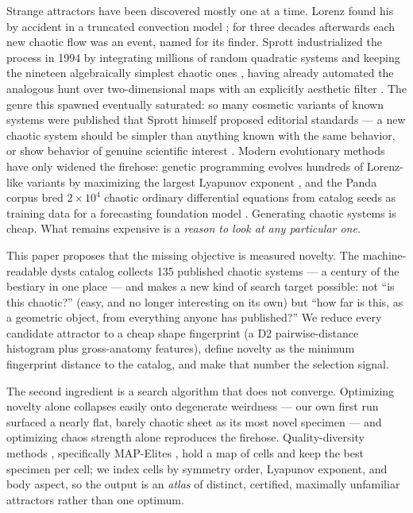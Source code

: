 \documentclass[11pt]{article}
\begin{document}
Strange attractors have been discovered mostly one at a time. Lorenz found
his by accident in a truncated convection model \citep{lorenz1963}; for
three decades afterwards each new chaotic flow was an event, named for its
finder. Sprott industrialized the process in 1994 by integrating millions
of random quadratic systems and keeping the nineteen algebraically simplest
chaotic ones \citep{sprott1994}, having already automated the analogous
hunt over two-dimensional maps with an explicitly aesthetic filter
\citep{sprott1993}. The genre this spawned eventually saturated: so many
cosmetic variants of known systems were published that Sprott himself
proposed editorial standards --- a new chaotic system should be simpler
than anything known with the same behavior, or show behavior of genuine
scientific interest \citep{sprott2011}. Modern evolutionary methods have
only widened the firehose: genetic programming evolves hundreds of
Lorenz-like variants by maximizing the largest Lyapunov exponent
\citep{panDas2015}, and the Panda corpus bred $2\times10^4$ chaotic
ordinary differential equations from catalog seeds as training data for a
forecasting foundation model \citep{lai2025panda}. Generating chaotic
systems is cheap. What remains expensive is a \emph{reason to look at any
particular one}.

This paper proposes that the missing objective is measured novelty. The
machine-readable \textsf{dysts} catalog \citep{gilpin2021} collects 135
published chaotic systems --- a century of the bestiary in one place ---
and makes a new kind of search target possible: not ``is this chaotic?''
(easy, and no longer interesting on its own) but ``how far is this, as a
geometric object, from everything anyone has published?'' We reduce every
candidate attractor to a cheap shape fingerprint (a D2 pairwise-distance
histogram \citep{osada2002} plus gross-anatomy features), define novelty
as the minimum fingerprint distance to the catalog, and make that number
the selection signal.

The second ingredient is a search algorithm that does not converge.
Optimizing novelty alone collapses easily onto degenerate weirdness ---
our own first run surfaced a nearly flat, barely chaotic sheet as its most
novel specimen --- and optimizing chaos strength alone reproduces the
firehose. Quality-diversity methods \citep{lehmanStanley2011,pugh2016},
specifically MAP-Elites \citep{mouretClune2015}, hold a map of cells and
keep the best specimen per cell; we index cells by symmetry order,
Lyapunov exponent, and body aspect, so the output is an \emph{atlas} of
distinct, certified, maximally unfamiliar attractors rather than one
optimum.
\end{document}
